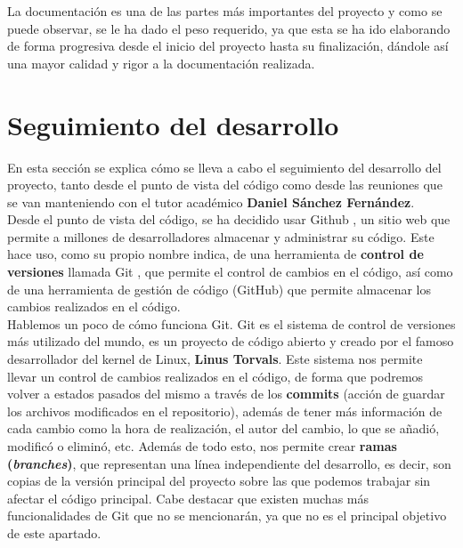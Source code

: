 La documentación es una de las partes más importantes del proyecto y como se puede observar,
se le ha dado el peso requerido, ya que esta se ha ido elaborando de forma progresiva desde
el inicio del proyecto hasta su finalización, dándole así una mayor calidad y rigor a la
documentación realizada.

\section{Seguimiento del desarrollo} \label{sec:tracking}
En esta sección se explica cómo se lleva a cabo el seguimiento del desarrollo del proyecto,
tanto desde el punto de vista del código como desde las reuniones que se van manteniendo
con el tutor académico \textbf{Daniel Sánchez Fernández}.\\

Desde el punto de vista del código, se ha decidido usar Github \cite{github}, un sitio web
que permite a millones de desarrolladores almacenar y administrar su código. Este hace uso,
como su propio nombre indica, de una herramienta de \textbf{control de versiones} llamada
Git \cite{git}, que permite el control de cambios en el código, así como de una herramienta
de gestión de código (GitHub) que permite almacenar los cambios realizados en el código.\\

Hablemos un poco de cómo funciona Git. Git es el sistema de control de versiones más
utilizado del mundo, es un proyecto de código abierto y creado por el famoso desarrollador
del kernel de Linux, \textbf{Linus Torvals}. Este sistema nos permite llevar un control de
cambios realizados en el código, de forma que podremos volver a estados pasados del mismo
a través de los \textbf{commits} (acción de guardar los archivos modificados en el
repositorio), además de tener más información de cada cambio como la hora de realización,
el autor del cambio, lo que se añadió, modificó o eliminó, etc. Además de todo esto, nos
permite crear \textbf{ramas (\textit{branches})}, que representan una línea independiente del
desarrollo, es decir, son copias de la versión principal del proyecto sobre las que podemos
trabajar sin afectar el código principal. Cabe destacar que existen muchas más
funcionalidades de Git que no se mencionarán, ya que no es el principal objetivo de este
apartado.\\

